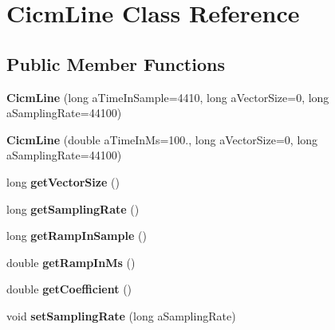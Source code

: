 \hypertarget{class_cicm_line}{\section{Cicm\-Line Class Reference}
\label{class_cicm_line}
}
\subsection*{Public Member Functions}
\begin{DoxyCompactItemize}
\item 
\hypertarget{class_cicm_line_a1e4c4c8a02a5b964af98e8034ca722ec}{{\bfseries Cicm\-Line} (long a\-Time\-In\-Sample=4410, long a\-Vector\-Size=0, long a\-Sampling\-Rate=44100)}\label{class_cicm_line_a1e4c4c8a02a5b964af98e8034ca722ec}

\item 
\hypertarget{class_cicm_line_aaf8fafba2b436da502ffd90c11803043}{{\bfseries Cicm\-Line} (double a\-Time\-In\-Ms=100., long a\-Vector\-Size=0, long a\-Sampling\-Rate=44100)}\label{class_cicm_line_aaf8fafba2b436da502ffd90c11803043}

\item 
\hypertarget{class_cicm_line_ae930ff600e396194535344b404bde04d}{long {\bfseries get\-Vector\-Size} ()}\label{class_cicm_line_ae930ff600e396194535344b404bde04d}

\item 
\hypertarget{class_cicm_line_a1333edda51022435eb0b766c4fa683ed}{long {\bfseries get\-Sampling\-Rate} ()}\label{class_cicm_line_a1333edda51022435eb0b766c4fa683ed}

\item 
\hypertarget{class_cicm_line_a80906ed66c29493501e3c9f263109430}{long {\bfseries get\-Ramp\-In\-Sample} ()}\label{class_cicm_line_a80906ed66c29493501e3c9f263109430}

\item 
\hypertarget{class_cicm_line_ab5debf1f919532f78fc8f08376b4ae06}{double {\bfseries get\-Ramp\-In\-Ms} ()}\label{class_cicm_line_ab5debf1f919532f78fc8f08376b4ae06}

\item 
\hypertarget{class_cicm_line_a4f489a8a7f208ea08d029eece29eea4d}{double {\bfseries get\-Coefficient} ()}\label{class_cicm_line_a4f489a8a7f208ea08d029eece29eea4d}

\item 
\hypertarget{class_cicm_line_a04ac8461b3a011bfa3cfb15343677566}{void {\bfseries set\-Sampling\-Rate} (long a\-Sampling\-Rate)}\label{class_cicm_line_a04ac8461b3a011bfa3cfb15343677566}


\end{DoxyCompactItemize}
